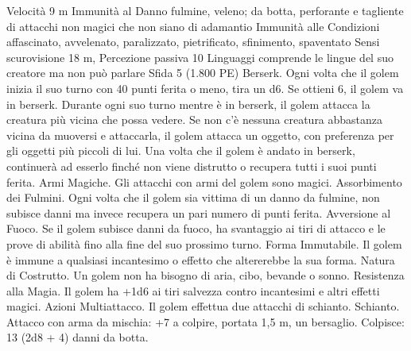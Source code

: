 \begin{multicols}{2}
Velocità 9 m
Immunità al Danno fulmine, veleno; da botta, perforante e
tagliente di attacchi non magici che non siano di adamantio
Immunità alle Condizioni affascinato, avvelenato, paralizzato,
pietrificato, sfinimento, spaventato
Sensi scurovisione 18 m, Percezione passiva 10
Linguaggi comprende le lingue del suo creatore ma non può
parlare
Sfida 5 (1.800 PE)
Berserk. Ogni volta che il golem inizia il suo turno con 40 punti
ferita o meno, tira un d6. Se ottieni 6, il golem va in berserk.
Durante ogni suo turno mentre è in berserk, il golem attacca la
creatura più vicina che possa vedere. Se non c’è nessuna creatura
abbastanza vicina da muoversi e attaccarla, il golem attacca un
oggetto, con preferenza per gli oggetti più piccoli di lui. Una
volta che il golem è andato in berserk, continuerà ad esserlo
finché non viene distrutto o recupera tutti i suoi punti ferita.
Armi Magiche. Gli attacchi con armi del golem sono magici.
Assorbimento dei Fulmini. Ogni volta che il golem sia vittima di
un danno da fulmine, non subisce danni ma invece recupera un
pari numero di punti ferita.
Avversione al Fuoco. Se il golem subisce danni da fuoco, ha
svantaggio ai tiri di attacco e le prove di abilità fino alla fine del
suo prossimo turno.
Forma Immutabile. Il golem è immune a qualsiasi incantesimo o
effetto che altererebbe la sua forma.
Natura di Costrutto. Un golem non ha bisogno di aria, cibo,
bevande o sonno.
Resistenza alla Magia. Il golem ha +1d6 ai tiri salvezza
contro incantesimi e altri effetti magici.
Azioni
Multiattacco. Il golem effettua due attacchi di schianto.
Schianto. Attacco con arma da mischia: +7 a colpire, portata 1,5
m, un bersaglio.
Colpisce: 13 (2d8 + 4) danni da botta.
 

\end{multicols}
